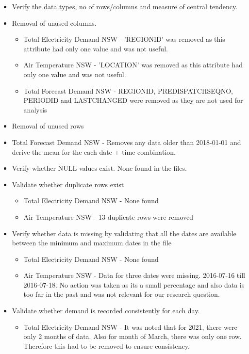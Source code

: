 \documentclass[mstat,12pt]{unswthesis}
\begin{document}
\begin{itemize}
  \item Verify the data types, no of rows/columns and measure of central tendency.
  \item Removal of unused columns. 
    \begin{itemize}
      \item Total Electricity Demand NSW - 'REGIONID' was removed as this attribute had only one value and was not useful.
      \item Air Temperature NSW - 'LOCATION' was removed as this attribute had only one value and was not useful.
      \item Total Forecast Demand NSW - REGIONID, PREDISPATCHSEQNO, PERIODID and LASTCHANGED were removed as they are not used for analysis
    \end{itemize}
  \item Removal of unused rows
    \item Total Forecast Demand NSW - Removes any data older than 2018-01-01 and derive the mean for the each date + time combination.
  \item Verify whether NULL values exist. None found in the files.
  \item Validate whether duplicate rows exist
    \begin{itemize}
      \item Total Electricity Demand NSW - None found
      \item Air Temperature NSW - 13 duplicate rows were removed
    \end{itemize}
  \item Verify whether data is missing by validating that all the dates are available between the minimum and maximum dates in the file
    \begin{itemize}
      \item Total Electricity Demand NSW - None found
      \item Air Temperature NSW - Data for three dates were missing. 2016-07-16 till 2016-07-18. No action was taken as its a small percentage and also data is too far in the past and was not relevant for our research question.
    \end{itemize}
  \item Validate whether demand is recorded consistently for each day. 
    \begin{itemize}
      \item Total Electricity Demand NSW - It was noted that for 2021, there were only 2 months of data. Also for month of March, there was only one row. Therefore this had to be removed to ensure consistency.

\end{itemize}
\end{itemize}
\end{document}
